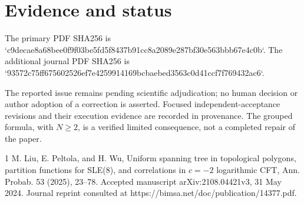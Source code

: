 \documentclass[10pt]{article}
\begin{document}
\section*{Evidence and status}
The primary PDF SHA256 is `c9decae8a68bee0f9f03be5fd5f8437b91cc8a2089e287bf30e563bbb67e4c0b`. The additional journal PDF SHA256 is `93572c75ff675602526ef7e4259914169bcbaebed3563c0d41ccf7f769432ac6`.\par
The reported issue remains pending scientific adjudication; no human decision or author adoption of a correction is asserted. Focused independent-acceptance revisions and their execution evidence are recorded in provenance. The grouped formula, with \(N\ge2\), is a verified limited consequence, not a completed repair of the paper.\par
1 M. Liu, E. Peltola, and H. Wu, Uniform spanning tree in topological polygons, partition functions for SLE(8), and correlations in \(c=-2\) logarithmic CFT, Ann. Probab. 53 (2025), 23–78. Accepted manuscript arXiv:2108.04421v3, 31 May 2024. Journal reprint consulted at https://bimsa.net/doc/publication/14377.pdf.\par
\end{document}
